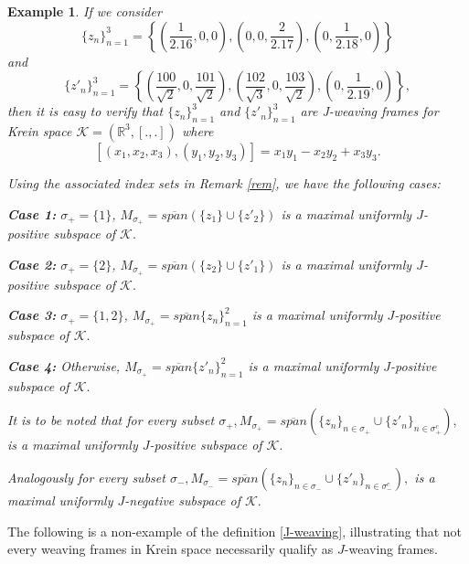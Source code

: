 \documentclass[article,12pt]{amsart}
\newtheorem{ex}[thm]{Example}
\begin{document}
\begin{ex}
	If we consider $$
	\{z_n\}_{n =1}^3 = \left\{ \left(\dfrac{1}{2.16}, 0, 0 \right), \left(0, 0, \dfrac{2}{2.17} \right), \left(0, \dfrac{1}{2.18}, 0 \right)\right\}
	$$ and 
$$
\{z'_n\}_{n =1}^3 = \left\{  \left(\dfrac{100}{\sqrt{2}}, 0, \dfrac{101}{\sqrt{2}}\right), \left(\dfrac{102}{\sqrt{3}}, 0, \dfrac{103}{\sqrt{2}}\right), \left(0, \dfrac{1}{2.19}, 0\right)\right\},
$$ then it is easy to verify that $\{z_n\}_{n =1}^3$ and $\{z'_n\}_{n =1}^3$ are J-weaving frames for Krein space $\mathcal{K} = (\mathbb{R}^3, [., .])$ where  $$[(x_1, x_2, x_3), (y_1, y_2, y_3)] = x_1y_1 - x_2 y_2 + x_3 y_3.$$ 

Using the associated index sets in Remark \ref{rem}, we have the following cases:
 
{\bf Case 1:} $\sigma_+ = \{1\}$, $ M_{\sigma_+} = \overline{span} (\{z_1\} \cup \{z'_2\})$ is a maximal uniformly $J$-positive subspace of $\mathcal{K}.$ 
 
 {\bf Case 2:} $\sigma_+ = \{2\}$, $ M_{\sigma_+} = \overline{span} (\{z_2\} \cup \{z'_1\})$ is a maximal uniformly $J$-positive subspace of $\mathcal{K}.$
	
{\bf Case 3:} $\sigma_+ = \{1, 2\}$,  $ M_{\sigma_+} = \overline{span} \{z_n\}_{n = 1}^2 $ is a maximal uniformly $J$-positive subspace of $\mathcal{K}.$
	 
{\bf Case 4:}	Otherwise,  $ M_{\sigma_+} = \overline{span} \{z'_n\}_{n = 1}^2 $ is a maximal uniformly $J$-positive subspace of $\mathcal{K}.$ 
	  
It is to be noted that for every subset $\sigma_+,  M_{\sigma_+} = \overline{span} (\{z_n\}_{n \in   \sigma_+} \cup \{z'_n\}_{n \in \sigma^c_+}),$ is a maximal uniformly $J$-positive subspace of $\mathcal{K}.$ 
	  
Analogously for every subset $\sigma_-,  M_{\sigma_-} = \overline{span} (\{z_n\}_{n \in   \sigma_-} \cup \{z'_n\}_{n \in \sigma^c_-}),$ is a maximal uniformly $J$-negative subspace of $\mathcal{K}.$
	
	
\end{ex}

The following is a non-example of the definition \ref{J-weaving}, illustrating that not every weaving frames in Krein space necessarily qualify as  $J$-weaving frames.
\end{document}
